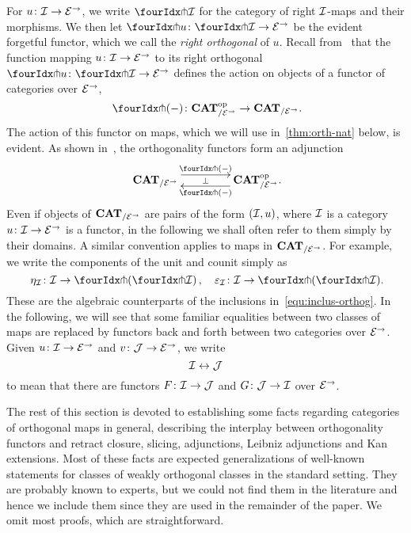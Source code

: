 \documentclass[reqno,10pt,a4paper,oneside,draft]{amsart}
\begin{document}
{{For  $u \co \cal{I} \to \catE^\to$, we write $\liftr{\cal{I}}$ for the category of right $\cal{I}$-maps and their morphisms. We then let $\liftr{u} \co \liftr{\cal{I}} \to \catE^\to$ be the evident forgetful functor, which we call the \emph{right orthogonal} of $u$. Recall from~\cite{garner:small-object-argument} that the function mapping $u \co \cal{I} \to \catE^\to$ to its right orthogonal $\liftr{u} \co \liftr{\cal{I}} \to \catE^\to$ defines the action on objects of a functor of categories over $\catE^\to$,
\[
  \liftr{\brarghole} \co \CAT_{/\catE^\to}^{\op} \to \CAT_{/\catE^\to} \rlap{.}
\]
The action of this functor on maps, which we will use in~\cref{thm:orth-nat} below, is evident.
As shown in~\cite[Proposition~3.8]{garner:small-object-argument}, the orthogonality functors form an adjunction
\begin{equation} \label{garner-adjunction}
\begin{gathered}
\xymatrix@C+2em{
  \CAT_{/\catE^\to}
  \ar@<5pt>[r]^-{\liftl{\brarghole}}
  \ar@{}[r]|-{\bot}
&
  \CAT_{/\catE^\to}^{\op} \rlap{.}
  \ar@<5pt>[l]^-{\liftr{\brarghole}}
}
\end{gathered}
\end{equation}
Even if objects of $\CAT_{/\catE^\to}$ are pairs of the form $(\cal{I}, u)$, where $\cal{I}$ is a category $u \co
\cal{I} \to \catE^\to$ is a functor, in the following we shall often refer to them simply by their domains. A similar convention applies
to maps in $\CAT_{/\catE^\to}$. For example, we write the components of the unit and counit simply as 
\[
\eta_\cal{I} \co \cal{I} \to \liftl{(\liftr{\cal{I}})} \, , \quad 
\varepsilon_\cal{I} \co \cal{I} \to \liftr{(\liftl{\cal{I}})} \rlap{.}
\]
These are the algebraic counterparts of the inclusions in~\eqref{equ:inclus-orthog}. In the following, we will see that some familiar equalities between
two classes of maps are replaced by functors back and forth between two categories over $\cal{E}^\to$. Given $u \co \cal{I} \to \cal{E}^\to$ and
$v \co \cal{J} \to \cal{E}^\to$, we write 
\begin{equation}
\label{equ:logical-equivalence}
\cal{I} \leftrightarrow \cal{J} 
\end{equation}
to mean that there are functors $F \co \cal{I} \to \cal{J}$ and $G \co \cal{J} \to \cal{I}$ over $\cal{E}^\to$. 




The rest of this section is devoted to establishing some facts regarding categories of orthogonal maps in general, describing the interplay between orthogonality functors and retract closure, slicing, adjunctions, Leibniz adjunctions and Kan extensions. Most of these facts are expected generalizations of well-known statements for classes of weakly orthogonal classes in the standard setting.
They are probably known to experts, but we could not find them in the literature and hence we include them since they are used in the remainder of the paper. We omit  most proofs, which are straightforward. 

}}
\end{document}
